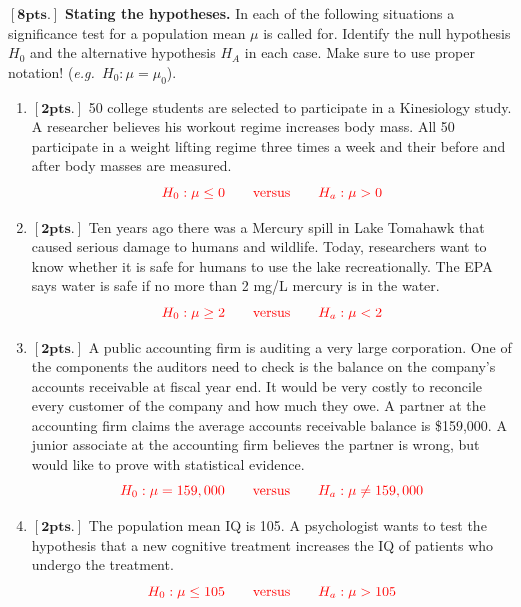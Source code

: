 \item $\mathbf{[8pts.]}$ \textbf{Stating the hypotheses.} In each of the following situations a significance test for a population mean $\mu$ is called for.  Identify the null hypothesis $H_0$ and the alternative hypothesis $H_A$ in each case. Make sure to use proper notation! (\textit{e.g.\ $H_0: \mu = \mu_0$}).
	\begin{enumerate}
		\item $\mathbf{[2pts.]}$ 50 college students are selected to participate in a Kinesiology study. A researcher believes his workout regime increases body mass. All 50 participate in a weight lifting regime three times a week and their before and after body masses are measured. 
$${\color{red} H_0: \mu \leq 0 \qquad \mbox{versus}  \qquad H_a: \mu > 0}$$

	\item $\mathbf{[2pts.]}$ Ten years ago there was a Mercury spill in Lake Tomahawk that caused serious damage to humans and wildlife. Today, researchers want to know whether it is safe for humans to use the lake recreationally. The EPA says water is safe if no more than 2 mg/L mercury is in the water.
$${\color{red} H_0: \mu \geq 2 \qquad \mbox{versus}  \qquad H_a: \mu < 2}$$

	\item $\mathbf{[2pts.]}$ A public accounting firm is auditing a very large corporation. One of the components the auditors need to check is the balance on the company's accounts receivable at fiscal year end. It would be very costly to reconcile every customer of the company and how much they owe. A partner at the accounting firm claims the average accounts receivable balance is \$159,000. A junior associate at the accounting firm believes the partner is wrong, but would like to prove with statistical evidence. 
$${\color{red} H_0: \mu = 159,000 \qquad \mbox{versus}  \qquad  H_a: \mu \neq 159,000}$$
		\item $\mathbf{[2pts.]}$ The population mean IQ is 105. A psychologist wants to test the hypothesis that a new cognitive treatment increases the IQ of patients who undergo the treatment. 
$${\color{red} H_0: \mu \leq 105 \qquad \mbox{versus}  \qquad  H_a: \mu > 105}$$
	\end{enumerate}